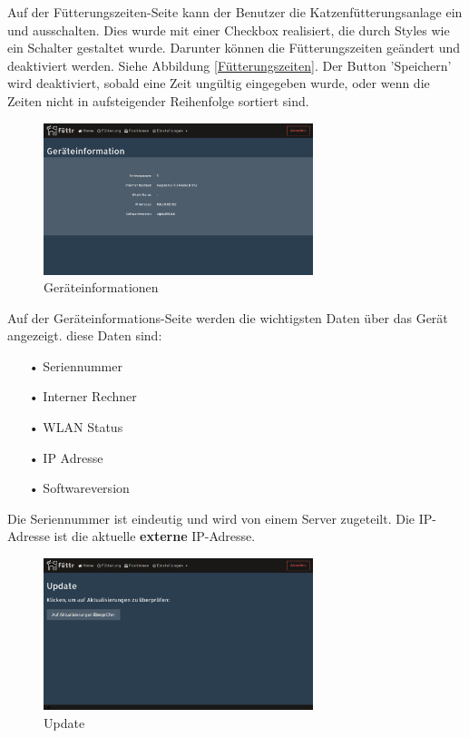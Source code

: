 Auf der Fütterungszeiten-Seite kann der Benutzer die Katzenfütterungsanlage ein und ausschalten. Dies wurde mit einer Checkbox realisiert, die durch Styles wie ein Schalter gestaltet wurde. Darunter können die Fütterungszeiten geändert und deaktiviert werden. Siehe Abbildung \ref{Fütterungszeiten}. Der Button 'Speichern' wird deaktiviert, sobald eine Zeit ungültig eingegeben wurde, oder wenn die Zeiten nicht in aufsteigender Reihenfolge sortiert sind. \newpage

\begin{figure}
\vspace{-10pt}
  \begin{center}
    \includegraphics[width=0.7\textwidth]{Bilder/Greistorfer/Gerateinformation}
  \end{center}
  \caption{Geräteinformationen}
  \label{Geräteinformationen}
  \vspace{-60pt}
\end{figure}

Auf der Geräteinformations-Seite werden die wichtigsten Daten über das Gerät angezeigt. diese Daten sind:
\begin{itemize}
\item[•]Seriennummer
\item[•]Interner Rechner
\item[•]WLAN Status
\item[•]IP Adresse
\item[•]Softwareversion
\end{itemize}
Die Seriennummer ist eindeutig und wird von einem Server zugeteilt. Die IP-Adresse ist die aktuelle \textbf{externe} IP-Adresse. \\

\begin{figure}
\vspace{-10pt}
  \begin{center}
    \includegraphics[width=0.7\textwidth]{Bilder/Greistorfer/Update}
  \end{center}
  \caption{Update}
  \label{Update}
  \vspace{-10pt}
\end{figure}

